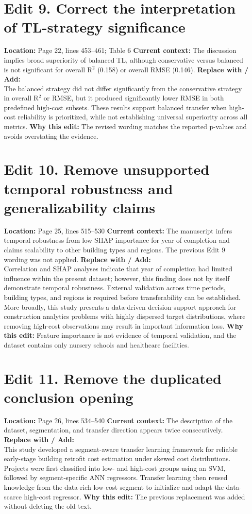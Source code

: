 \documentclass[11pt]{article}
\newcommand{\loc}[1]{\textbf{Location:} #1}
\newcommand{\current}[1]{\textbf{Current context:} #1}
\newcommand{\replacewith}[1]{\textbf{Replace with / Add:}\\{\color{blue}#1}}
\newcommand{\why}[1]{\textbf{Why this edit:} #1}
\begin{document}
\section*{Edit 9. Correct the interpretation of TL-strategy significance}
\loc{Page 22, lines 453--461; Table 6}
\current{The discussion implies broad superiority of balanced TL, although conservative versus balanced is not significant for overall R$^2$ (0.158) or overall RMSE (0.146).}
\replacewith{The balanced strategy did not differ significantly from the conservative strategy in overall R$^2$ or RMSE, but it produced significantly lower RMSE in both predefined high-cost subsets. These results support balanced transfer when high-cost reliability is prioritized, while not establishing universal superiority across all metrics.}
\why{The revised wording matches the reported p-values and avoids overstating the evidence.}

\section*{Edit 10. Remove unsupported temporal robustness and generalizability claims}
\loc{Page 25, lines 515--530}
\current{The manuscript infers temporal robustness from low SHAP importance for year of completion and claims scalability to other building types and regions. The previous Edit 9 wording was not applied.}
\replacewith{Correlation and SHAP analyses indicate that year of completion had limited influence within the present dataset; however, this finding does not by itself demonstrate temporal robustness. External validation across time periods, building types, and regions is required before transferability can be established. More broadly, this study presents a data-driven decision-support approach for construction analytics problems with highly dispersed target distributions, where removing high-cost observations may result in important information loss.}
\why{Feature importance is not evidence of temporal validation, and the dataset contains only nursery schools and healthcare facilities.}

\section*{Edit 11. Remove the duplicated conclusion opening}
\loc{Page 26, lines 534--540}
\current{The description of the dataset, segmentation, and transfer direction appears twice consecutively.}
\replacewith{This study developed a segment-aware transfer learning framework for reliable early-stage building retrofit cost estimation under skewed cost distributions. Projects were first classified into low- and high-cost groups using an SVM, followed by segment-specific ANN regressors. Transfer learning then reused knowledge from the data-rich low-cost segment to initialize and adapt the data-scarce high-cost regressor.}
\why{The previous replacement was added without deleting the old text.}
\end{document}
